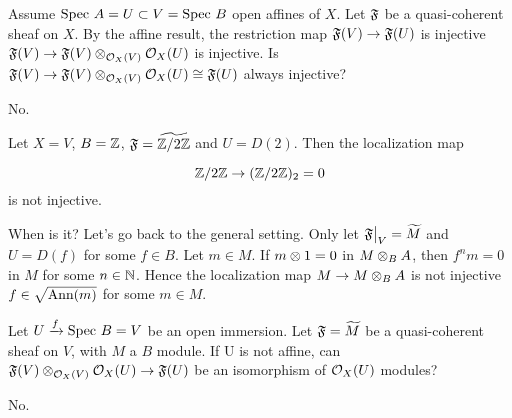 \bigskip


\begin{question}
Assume $\mbox{Spec }{A} = U \subset V = \mbox{Spec }{B}$ open affines of $X$.
Let $\mathfrak{F}$ be a quasi-coherent sheaf on $X$.
By the affine result, the restriction map $\mathfrak{F}(V) \rightarrow \mathfrak{F}(U)$ is injective \iff $\mathfrak{F}(V) \rightarrow \mathfrak{F}(V)\otimes_{\mathcal{O}_X(V)}\mathcal{O}_X(U)$ is injective.
Is $\mathfrak{F}(V) \rightarrow \mathfrak{F}(V)\otimes_{\mathcal{O}_X(V)} \mathcal{O}_X(U) \cong \mathfrak{F}(U)$ always injective?
\end{question}
\begin{Qanswer}
No.

Let $X=V$, $B= \mathbb{Z}$, $\mathfrak{F}= \widetilde{\mathbb{Z}/2\mathbb{Z}}$ and $U= D(2)$.
Then the localization map 

\[ \mathbb{Z}/2\mathbb{Z} \rightarrow (\mathbb{Z}/2\mathbb{Z})_2 = 0\]
is not injective. 

\bigskip
When is it?
Let's go back to the general setting. 
Only let $\restr{\shf}{V}= \widetilde{M}$ and $U= D(f)$ for some $f \in B$.
Let $m\in M$. If $m \otimes 1 = 0$ in $M\otimes_B A$, then $f^n m = 0$ in $M$ for some $n\in \mathbb{N}$.
Hence the localization map $M\rightarrow M\otimes_B A$ is not injective \iff $f\in \sqrt{\mbox{Ann}(m)}$ for some $m\in M$.
\end{Qanswer}


\begin{question}
Let $U \xrightarrow{f} \mbox{Spec }{B} = V$ be an open immersion.
Let $\mathfrak{F}=\widetilde{M}$ be a quasi-coherent sheaf on $V$, with $M$ a $B$ module. 
If U is not affine, can $\mathfrak{F}(V)\otimes_{\mathcal{O}_X(V)} \mathcal{O}_X(U) \rightarrow \mathfrak{F}(U)$ be an isomorphism of $\mathcal{O}_X(U)$ modules?
\end{question}
\begin{Qanswer}
No.
\end{Qanswer}


